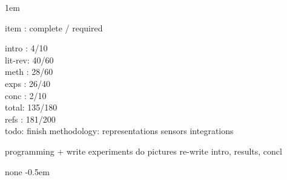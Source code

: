 \documentclass[12pt]{book}
\begin{document}
\raggedbottom
\setlength{\oddsidemargin}{53pt}
\setlength{\evensidemargin}{53pt}
\setlength{\marginparwidth}{57pt}
\setlength{\footskip}{30pt}
\openup 1em

\frontmatter
%

\tableofcontents
\listoffigures
\listoftables
\mainmatter
item : complete / required

intro : 4/10\\
lit-rev: 40/60\\
meth : 28/60\\
exps : 26/40\\
conc : 2/10\\

total: 135/180\\
refs : 181/200\\



todo:
	finish methodology:
		representations
		sensors
		integrations
		
	programming + write experiments
	do pictures
	re-write intro, results, concl 

\appendix
none
\backmatter
\openup -0.5em
%


\end{document}
